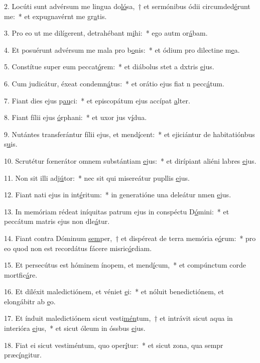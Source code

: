 2. Locúti sunt advérsum me lingua do\uline{ló}sa,~† et sermónibus ódii circumded\uline{é}runt me:~* et expugnavérnt me gr\uline{a}tis.\par 
3. Pro eo ut me dilígerent, detrahébant m\uline{i}hi:~* ego autm or\uline{á}bam.\par 
4. Et posuérunt advérsum me mala pro b\uline{o}nis:~* et ódium pro dilectine m\uline{e}a.\par 
5. Constítue super eum peccat\uline{ó}rem:~* et diábolus stet a dxtris \uline{e}jus.\par 
6. Cum judicátur, éxeat condemn\uline{á}tus:~* et orátio ejus fiat n pecc\uline{á}tum.\par 
7. Fiant dies ejus p\uline{au}ci:~* et episcopátum ejus accípat \uline{a}lter.\par 
8. Fiant fílii ejus \uline{ó}rphani:~* et uxor jus v\uline{í}dua.\par 
9. Nutántes transferántur fílii ejus, et mend\uline{í}cent:~* et ejiciántur de habitatiónbus s\uline{u}is.\par 
10. Scrutétur fœnerátor omnem substántiam \uline{e}jus:~* et dirípiant aliéni labres \uline{e}jus.\par 
11. Non sit illi adj\uline{ú}tor:~* nec sit qui misereátur pupllis \uline{e}jus.\par 
12. Fiant nati ejus in int\uline{é}ritum:~* in generatióne una deleátur nmen \uline{e}jus.\par 
13. In memóriam rédeat iníquitas patrum ejus in conspéctu D\uline{ó}mini:~* et peccátum matris ejus non dle\uline{á}tur.\par 
14. Fiant contra Dóminum \uline{sem}per,~† et dispéreat de terra memória e\uline{ó}rum:~* pro eo quod non est recordátus fácere misric\uline{ó}rdiam.\par 
15. Et persecútus est hóminem ínopem, et mend\uline{í}cum,~* et compúnctum corde mortfic\uline{á}re.\par 
16. Et diléxit maledictiónem, et véniet \uline{e}i:~* et nóluit benedictiónem, et elongábitr ab \uline{e}o.\par 
17. Et índuit maledictiónem sicut vesti\uline{mén}tum,~† et intrávit sicut aqua in interióra \uline{e}jus,~* et sicut óleum in óssbus \uline{e}jus.\par 
18. Fiat ei sicut vestiméntum, quo oper\uline{í}tur:~* et sicut zona, qua sempr præc\uline{í}ngitur.\par 

